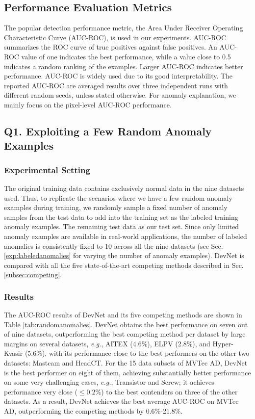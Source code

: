 \documentclass[10pt,journal,compsoc]{IEEEtran}
\newcommand{\eg}{\textit{e.g.}}
\begin{document}
\subsection{Performance Evaluation Metrics}

The popular detection performance metric, the Area Under Receiver Operating Characteristic Curve (AUC-ROC), is used in our experiments. AUC-ROC summarizes the ROC curve of true positives against false positives.
An AUC-ROC value of one indicates the best performance, while a value close to 0.5 indicates a random ranking of the examples. Larger AUC-ROC indicates better performance. AUC-ROC is widely used due to its good interpretability.
The reported AUC-ROC are averaged results over three independent runs with different random seeds, unless stated otherwise. For anomaly explanation, we mainly focus on the pixel-level AUC-ROC performance.

\subsection{Q1. Exploiting a Few Random Anomaly Examples}\label{subsec:random_anomalies}

\subsubsection{Experimental Setting}\label{subsubsec:randomexample}

The original training data contains exclusively normal data in the nine datasets used. Thus, to replicate the scenarios where we have a few random anomaly examples during training, we randomly sample a fixed number of anomaly samples from the test data to add into the training set as the labeled training anomaly examples. The remaining test data as our test set. Since only limited anomaly examples are available in real-world applications, the number of labeled anomalies is consistently fixed to 10 across all the nine datasets (see Sec. \ref{exp:labeledanomalies} for varying the number of anomaly examples). DevNet is compared with all the five state-of-the-art competing methods described in Sec. \ref{subsec:competing}.

\subsubsection{Results}

The AUC-ROC results of DevNet and its five competing methods are shown in Table \ref{tab:randomanomalies}. DevNet obtains the best performance on seven out of nine datasets, outperforming the best competing method per dataset by large margins on several datasets, \eg, AITEX (4.6\%), ELPV (2.8\%), and Hyper-Kvasir (5.6\%), with its performance close to the best performers on the other two datasets: Mastcam and HeadCT. For the 15 data subsets of MVTec AD, DevNet is the best performer on eight of them, achieving substantially better performance on some very challenging cases, \eg, Transistor and Screw; it achieves performance very close ($\leq0.2\%$) to the best contenders on three of the other datasets. As a result, DevNet achieves the best average AUC-ROC on MVTec AD, outperforming the competing methods by 0.6\%-21.8\%.
\end{document}
